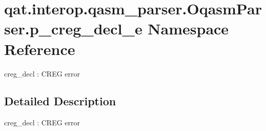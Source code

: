 \hypertarget{namespaceqat_1_1interop_1_1qasm__parser_1_1OqasmParser_1_1p__creg__decl__e}{\section{qat.\-interop.\-qasm\-\_\-parser.\-Oqasm\-Parser.\-p\-\_\-creg\-\_\-decl\-\_\-e Namespace Reference}
\label{namespaceqat_1_1interop_1_1qasm__parser_1_1OqasmParser_1_1p__creg__decl__e}
}


creg\-\_\-decl \-: C\-R\-E\-G error  




\subsection{Detailed Description}
creg\-\_\-decl \-: C\-R\-E\-G error 